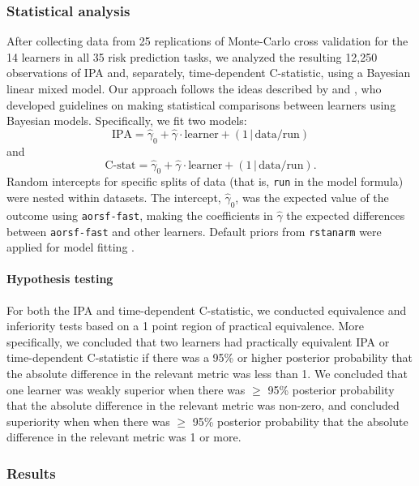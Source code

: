 \documentclass[twoside,11pt]{article}\usepackage[]{graphicx}\usepackage[]{xcolor}
\newcommand{\ie}{that is}
\begin{document}
\subsubsection{Statistical analysis}

After collecting data from 25 replications of Monte-Carlo cross validation for the 14 learners in all 35 risk prediction tasks, we analyzed the resulting 12,250 observations of IPA and, separately, time-dependent C-statistic, using a Bayesian linear mixed model. Our approach follows the ideas described by \citet{benavoli2017time} and \citet{tidymodels}, who developed guidelines on making statistical comparisons between learners using Bayesian models. Specifically, we fit two models: $$\text{IPA} = \widehat{\gamma}_0 + \widehat{\gamma} \cdot \text{learner} + (1\,|\, \text{data/run}) $$ and $$\text{C-stat} = \widehat{\gamma}_0 + \widehat{\gamma} \cdot \text{learner} + (1\,|\, \text{data/run}).$$ Random intercepts for specific splits of data (\ie, \texttt{run} in the model formula) were nested within datasets. The intercept, $\widehat{\gamma}_0$, was the expected value of the outcome using \texttt{aorsf-fast}, making the coefficients in $\widehat{\gamma}$ the expected differences between \texttt{aorsf-fast} and other learners. Default priors from \texttt{rstanarm} were applied for model fitting \citep{rstanarm}.

\paragraph{Hypothesis testing} For both the IPA and time-dependent C-statistic, we conducted equivalence and inferiority tests based on a 1 point region of practical equivalence. More specifically, we concluded that two learners had practically equivalent IPA or time-dependent C-statistic if there was a 95\% or higher posterior probability that the absolute difference in the relevant metric was less than 1. We concluded that one learner was weakly superior when there was $\geq$ 95\% posterior probability that the absolute difference in the relevant metric was non-zero, and concluded superiority when when there was $\geq$ 95\% posterior probability that the absolute difference in the relevant metric was 1 or more.



\subsubsection{Results} \label{sec:results_pred}
\end{document}
